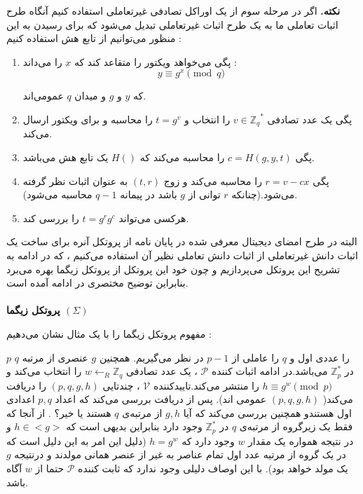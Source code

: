 \documentclass[12pt,a4paper]{article}
\begin{document}
\textbf{نکته. }
اگر در مرحله سوم از یک اوراکل تصادفی غیرتعاملی استفاده کنیم آنگاه طرح اثبات تعاملی ما به یک طرح اثبات غیرتعاملی تبدیل می‌شود که برای رسیدن به این منظور می‌توانیم از تابع هش استفاده کنیم :

\begin{enumerate}
	
	\item 
	پگی می‌خواهد ویکتور را متقاعد کند که
	$x$
	را می‌داند : 
	$$y \equiv g^x \pmod{q }$$
	
	که 
	$y$
	و
	$g$
	و میدان 
	$q$
	عمومی‌اند.
	\item 
	پگی یک عدد تصادفی 
	$ v \in {\mathbb{Z}_q}^*$
	را انتخاب و 
	$t = g^v$
	را محاسبه و برای ویکتور ارسال می‌کند.
	\item 
	پگی 
	$c = H(g,y,t)$
	را محاسبه می‌کند که 
	$H()$
	یک تابع هش می‌باشد.
	\item 
	پگی 
	$r = v - cx$
	را محاسبه می‌کند و زوج 
	$(t,r)$
 به عنوان اثبات نظر گرفته می‌شود.(چنانکه 
 $r$
 توانی از
 $g$
 باشد در پیمانه 
 $q-1$
 محاسبه می‌شود).
 \item 
 هرکسی می‌تواند 
 $t = g^rg^c$
 را بررسی کند.
\end{enumerate}



البته در طرح امضای دیجیتال معرفی شده در پایان نامه از پروتکل آنره
برای ساخت یک اثبات دانش غیرتعاملی  از اثبات دانش تعاملی نظیر آن استفاده می‌کنیم‌ ، که در ادامه به تشریح این پروتکل‌ می‌پردازیم و چون خود این پروتکل از پروتکل زیگما
بهره می‌برد بنابراین توضیح مختصری در ادامه آمده است.\\
\\

\textbf{پروتکل زیگما
$(\Sigma)$
}

مفهوم پروتکل زیگما را با یک مثال نشان می‌دهیم :

$p$
را عددی اول و 
$q$
را عاملی از 
$p-1$
در نظر می‌گیریم. همچنین 
$g$
عنصری از مرتبه 
$q$
در 
$\mathbb{Z}_p^*$
می‌باشد.در ادامه اثبات کننده 
$\mathcal{P}$
، یک عدد تصادفی 
$w \leftarrow_R \mathbb{Z}_q$
را انتخاب می‌کند و 
$h \equiv g^w \pmod{p}$
را منتشر می‌کند.تاییدکننده 
$\mathcal{V}$
 ، چندتایی 
 $(p,q,g,h)$
 را دریافت می‌کند(
 $(p,q,g,h)$
  عمومی اند). پس از دریافت بررسی می‌کند که اعداد 
  $p,q$
  اعدادی اول هستندو همچنین بررسی می‌کند که آیا 
  $g,h$
  از مرتبه‌ی 
  $q$
  هستند یا خیر؟ . از آنجا که فقط یک زیرگروه از مرتبه‌ی
  $q$
  در 
  $\mathbb{Z}_p^*$
  وجود دارد بنابراین بدیهی است که 
  $h \in <g>$
  و در نتیجه همواره یک مقدار 
  $w$
  وجود دارد که 
 $h = g^w$
 (دلیل این امر به این دلیل است که در یک گروه از مرتبه عدد اول تمام عناصر به غیر از عنصر همانی مولدند و درنتیجه 
 $g$
 یک مولد خواهد بود). با این اوصاف دلیلی وجود ندارد که ثابت کننده 
 $\mathcal{P}$
 حتما از 
   $w$
  آگاه باشد.
  
\end{document}
